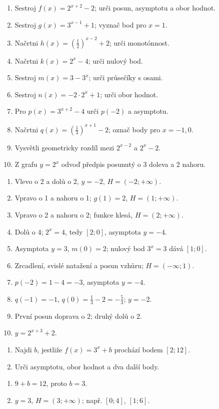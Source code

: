 \documentclass[11pt,a4paper]{article}
\begin{document}
\begin{zadaniReseniBox}[title={Samostatná práce 1}]
\begin{enumerate}[label=\alph*)]
\item Sestroj $f(x)=2^{x+2}-2$; urči posun, asymptotu a obor hodnot.
\item Sestroj $g(x)=3^{x-1}+1$; vyznač bod pro $x=1$.
\item Načrtni $h(x)=\left(\frac{1}{2}\right)^{x-2}+2$; urči monotónnost.
\item Načrtni $k(x)=2^x-4$; urči nulový bod.
\item Sestroj $m(x)=3-3^x$; urči průsečíky s osami.
\item Sestroj $n(x)=-2\cdot2^x+1$; urči obor hodnot.
\item Pro $p(x)=3^{x+2}-4$ urči $p(-2)$ a asymptotu.
\item Načrtni $q(x)=\left(\frac{1}{3}\right)^{x+1}-2$; označ body pro $x=-1,0$.
\item Vysvětli geometricky rozdíl mezi $2^{x-2}$ a $2^x-2$.
\item Z grafu $y=2^x$ odvoď předpis posunutý o 3 doleva a 2 nahoru.
\end{enumerate}
\tcblower
\begin{enumerate}[label=\alph*)]
\item Vlevo o 2 a dolů o 2, $y=-2$, $H=(-2;+\infty)$.
\item Vpravo o 1 a nahoru o 1; $g(1)=2$, $H=(1;+\infty)$.
\item Vpravo o 2 a nahoru o 2; funkce klesá, $H=(2;+\infty)$.
\item Dolů o 4; $2^x=4$, tedy $[2;0]$, asymptota $y=-4$.
\item Asymptota $y=3$, $m(0)=2$; nulový bod $3^x=3$ dává $[1;0]$.
\item Zrcadlení, svislé natažení a posun vzhůru; $H=(-\infty;1)$.
\item $p(-2)=1-4=-3$, asymptota $y=-4$.
\item $q(-1)=-1$, $q(0)=\frac{1}{3}-2=-\frac{5}{3}$; $y=-2$.
\item První posun doprava o 2; druhý dolů o 2.
\item $y=2^{x+3}+2$.
\end{enumerate}
\end{zadaniReseniBox}
\begin{zadaniReseniBox}[title={Rozšíření 1}]
\begin{enumerate}[label=\alph*)]
\item Najdi $b$, jestliže $f(x)=3^x+b$ prochází bodem $[2;12]$.
\item Urči asymptotu, obor hodnot a dva další body.
\end{enumerate}
\tcblower
\begin{enumerate}[label=\alph*)]
\item $9+b=12$, proto $b=3$.
\item $y=3$, $H=(3;+\infty)$; např. $[0;4]$, $[1;6]$.
\end{enumerate}
\end{zadaniReseniBox}
\end{document}
